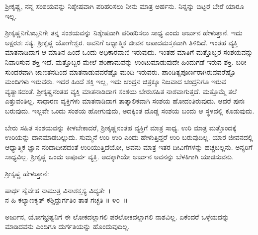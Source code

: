 \begin{artha}
ಶ‍್ರೀಕೃಷ್ಣ, ನನ್ನ ಸಂಶಯವನ್ನು ನಿಶ್ಶೇಷವಾಗಿ ಪರಿಹರಿಸಲು ನೀನು ಮಾತ್ರ ಅರ್ಹನು. ನಿನ್ನನ್ನು ಬಿಟ್ಟರೆ ಬೇರೆ ಯಾರೂ ಇಲ್ಲ.
\end{artha}

ಶ‍್ರೀಕೃಷ್ಣನಿಗೊಬ್ಬನಿಗೇ ತನ್ನ ಸಂಶಯವನ್ನು ನಿಶ್ಶೇಷವಾಗಿ ಪರಿಹರಿಸಲು ಸಾಧ್ಯ ಎಂದು ಅರ್ಜುನ ಹೇಳುತ್ತಾನೆ. ಇದು ಅಕ್ಷರಶಃ ಸತ್ಯ. ಶ‍್ರೀಕೃಷ್ಣ ಯೋಗೇಶ್ವರ. ಅವನಿಗೆ ಆಧ್ಯಾತ್ಮಿಕ ಜೀವನ ಆಪಾದಮಸ್ತಕವಾಗಿ ತಿಳಿದಿದೆ. ಇಂತಹ ವ್ಯಕ್ತಿ ಮಾತನಾಡಿದಾಗ ಆ ಮಾತಿನ ಹಿಂದೆ ಒಂದು ಅಧಿಕಾರವಾಣಿ ಇರುವುದು. ಇಂತಹ ಮಾತಿಗೆ ಮತ್ತೊಬ್ಬರ ಸಂಶಯವನ್ನು ನಿವಾರಿಸುವ ಶಕ್ತಿ ಇದೆ. ಮತ್ತೊಬ್ಬರ ಮೇಲೆ ಪರಿಣಾಮವನ್ನು ಉಂಟುಮಾಡುವುದೇ ಹಿಂದುಗಡೆ ಇರುವ ಶಕ್ತಿ. ಬರೀ ಸುಂದರವಾಗಿ ಜಾಣತನದಿಂದ ಮಾತನಾಡುವವರೆಷ್ಟೊ ಮಂದಿ ಇರುವರು. ಪಾಂಡಿತ್ಯಪೂರ್ಣರಾಗಿರುವವರೆಷ್ಟೊ ಮಂದಿಗಳು ಇರುವರು. ಇದರ ಹಿಂದೆ ಶಕ್ತಿ ಇಲ್ಲ, ಇದು ಚಂದ್ರನ ಚಿತ್ರಕ್ಕೂ ನಿಜವಾದ ಚಂದ್ರನಿಗೂ ಇರುವ ವ್ಯತ್ಯಾಸದಂತೆ. ಶ‍್ರೀಕೃಷ್ಣನಂತಹ ವ್ಯಕ್ತಿ ಮಾತನಾಡಿದಾಗ ಸಂಶಯ ಬೇರುಸಹಿತ ನಾಶವಾಗುತ್ತದೆ. ಮತ್ತೊಮ್ಮೆ ತಲೆ ಎತ್ತುವಂತಿಲ್ಲ. ಸಾಧಾರಣ ವ್ಯಕ್ತಿಗಳು ಮಾತನಾಡಿದಾಗ ತಾತ್ಕಾಲಿಕವಾಗಿ ಸಂಶಯ ಹೋದಂತಿರುವುದು. ಆದರೆ ಪುನಃ ಬರುವುದು. ಇಲ್ಲವೇ ಒಂದು ಸಂಶಯ ಹೋಗುವುದು, ಅದಕ್ಕಿಂತ ದೊಡ್ಡ ಸಂಶಯ ಬಂದು ಆ ಸ್ಥಳದಲ್ಲಿ ಕೂಡುವುದು.

ಬೇರು ಸಹಿತ ಸಂಶಯವನ್ನು ಕೀಳಬೇಕಾದರೆ, ಶ‍್ರೀಕೃಷ್ಣನಂತಹ ವ್ಯಕ್ತಿಗೆ ಮಾತ್ರ ಸಾಧ್ಯ. ಉರಿ ಮಾತ್ರ ಮತ್ತೊಂದಕ್ಕೆ ಉರಿಯನ್ನು ದಾನಮಾಡಬಲ್ಲುದು. ಸುಮ್ಮನೆ ಉರಿ ಉರಿ ಎಂದು ಹೇಳುತ್ತಿದ್ದರೆ ಉರಿ ಬರುವುದಿಲ್ಲ. ಯಾರ ಜೀವನದಲ್ಲಿ ಆಧ್ಯಾತ್ಮಿಕ ಜ್ಞಾನ ನಂದಾದೀಪದಂತೆ ಉರಿಯುತ್ತಿದೆಯೋ, ಅವನು ಮಾತ್ರ ಇತರ ದೀವಿಗೆಗಳನ್ನು ಹಚ್ಚಬಲ್ಲನು. ಅನ್ಯರಿಗೆ ಸಾಧ್ಯವಿಲ್ಲ. ಶ‍್ರೀಕೃಷ್ಣ ಒಂದು ಅಪೂರ್ವ ವ್ಯಕ್ತಿ. ಅದಕ್ಕಾಗಿಯೇ ಅರ್ಜುನ ಅವನನ್ನು ಬೆಳಕಿಗಾಗಿ ಯಾಚಿಸುವನು.

ಶ‍್ರೀಕೃಷ್ಣ ಹೇಳುತ್ತಾನೆ:

\begin{shloka}
ಪಾರ್ಥ ನೈವೇಹ ನಾಮುತ್ರ ವಿನಾಶಸ್ತಸ್ಯ ವಿದ್ಯತೇ~।\\ನ ಹಿ ಕಲ್ಯಾಣಕೃತ್ ಕಶ್ಚಿದ್ದುರ್ಗತಿಂ ತಾತ ಗಚ್ಛತಿ \hfill॥ ೪೦~॥
\end{shloka}

\begin{artha}
ಅರ್ಜುನ, ಯೋಗಭ್ರಷ್ಟನಿಗೆ ಈ ಲೋಕದಲ್ಲಾಗಲಿ ಪರಲೋಕದಲ್ಲಾಗಲಿ ನಾಶವಿಲ್ಲ. ಏಕೆಂದರೆ ಒಳ್ಳೆಯದನ್ನು ಮಾಡಿದವನು ಎಂದಿಗೂ ದುರ್ಗತಿಯನ್ನು ಹೊಂದುವುದಿಲ್ಲ.
\end{artha}

